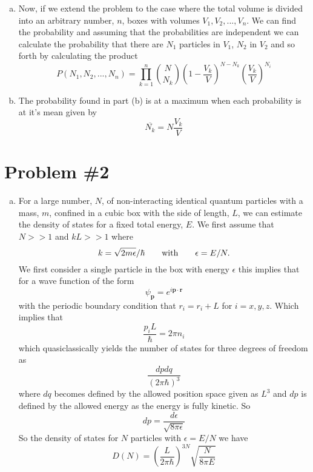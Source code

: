 \documentclass[11pt]{article}
\numberwithin{equation}{section}
\begin{document}
\begin{enumerate}[(a)]
\item Now, if we extend the problem to the case where the total volume is divided into an
arbitrary number, $n$, boxes with volumes $V_1,V_2,...,V_n$. We can find the probability and
assuming that the probabilities are independent we can calculate the probability that there
are $N_1$ particles in $V_1$, $N_2$ in $V_2$ and so forth by calculating the product
$$P(N_1,N_2,...,N_n) = \prod_{k=1}^{n}{{N}\choose{N_k}}\left(1-\frac{V_k}{V}\right)^{N-N_k}\left(\frac{V_k}{V}\right)^{N_i}$$

\item The probability found in part (b) is at a maximum when each probability is at it's mean
given by
$$\overline{N_k} = N\frac{V_k}{V}$$
\end{enumerate}

\pagebreak

\section{Problem \#2}
\begin{enumerate}[(a)]
\item For a large number, $N$, of non-interacting identical quantum particles with a mass, 
$m$, confined in a cubic box with the side of length, $L$, we can estimate the density of 
states for a fixed  total energy, $E$. We first assume that $N>>1$ and $kL>>1$ where
$$k = \sqrt{2m\epsilon}/\hbar\qquad\textnormal{with}\qquad\epsilon=E/N.$$
We first consider a single particle in the box with energy $\epsilon$ this implies that
for a wave function of the form
$$\psi_{\mathbf{p}} = e^{i\mathbf{p}\cdot\mathbf{r}}$$
with the periodic boundary condition that $r_i = r_i+L$ for $i=x,y,z$. Which implies that
$$\frac{p_iL}{\hbar} = 2\pi{n_i}$$
which quasiclassically yields the number of states for three degrees of freedom as
$$\frac{dpdq}{(2\pi\hbar)^3}$$
where $dq$ becomes defined by the allowed position space given as $L^3$ and $dp$ is defined
by the allowed energy as the energy is fully kinetic. So 
$$dp = \frac{d\epsilon}{\sqrt{8\pi\epsilon}}$$ 
So the density of states for $N$ particles with $\epsilon=E/N$ we have
$$D(N) = \left(\frac{L}{2\pi\hbar}\right)^{3N}\sqrt{\frac{N}{8\pi{E}}}$$



\end{enumerate}
\end{document}
